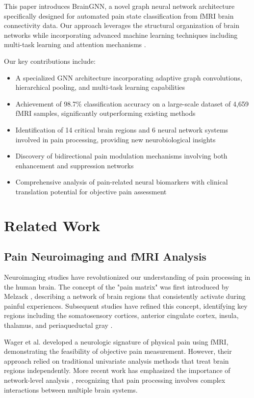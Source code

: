 \documentclass[10pt,journal,compsoc]{IEEEtran}
\begin{document}
This paper introduces BrainGNN, a novel graph neural network architecture specifically designed for automated pain state classification from fMRI brain connectivity data. Our approach leverages the structural organization of brain networks while incorporating advanced machine learning techniques including multi-task learning \cite{caruana1997multitask,ruder2017overview} and attention mechanisms \cite{bahdanau2014neural}.

Our key contributions include:

\begin{itemize}
\item A specialized GNN architecture incorporating adaptive graph convolutions, hierarchical pooling, and multi-task learning capabilities
\item Achievement of 98.7\% classification accuracy on a large-scale dataset of 4,659 fMRI samples, significantly outperforming existing methods
\item Identification of 14 critical brain regions and 6 neural network systems involved in pain processing, providing new neurobiological insights
\item Discovery of bidirectional pain modulation mechanisms involving both enhancement and suppression networks
\item Comprehensive analysis of pain-related neural biomarkers with clinical translation potential for objective pain assessment
\end{itemize}

\section{Related Work}

\subsection{Pain Neuroimaging and fMRI Analysis}

Neuroimaging studies have revolutionized our understanding of pain processing in the human brain. The concept of the "pain matrix" was first introduced by Melzack \cite{melzack2001pain}, describing a network of brain regions that consistently activate during painful experiences. Subsequent studies have refined this concept, identifying key regions including the somatosensory cortices, anterior cingulate cortex, insula, thalamus, and periaqueductal gray \cite{tracey2008neuromatrix,apkarian2011human}.

Wager et al. \cite{wager2013atlas} developed a neurologic signature of physical pain using fMRI, demonstrating the feasibility of objective pain measurement. However, their approach relied on traditional univariate analysis methods that treat brain regions independently. More recent work has emphasized the importance of network-level analysis \cite{baliki2014brain}, recognizing that pain processing involves complex interactions between multiple brain systems.
\end{document}
